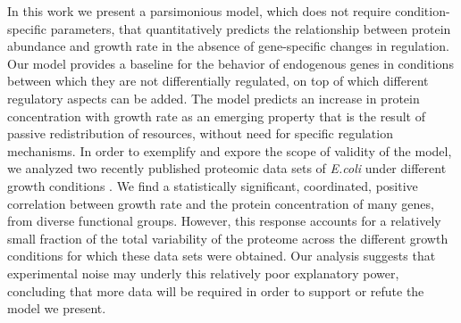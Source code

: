 In this work we present a parsimonious model, which does not require condition-specific parameters, that quantitatively predicts the relationship between protein abundance and growth rate in the absence of gene-specific changes in regulation.
Our model provides a baseline for the behavior of endogenous genes in conditions between which they are not differentially regulated, on top of which different regulatory aspects can be added.
The model predicts an increase in protein concentration with growth rate as an emerging property that is the result of passive redistribution of resources, without need for specific regulation mechanisms.
In order to exemplify and expore the scope of validity of the model, we analyzed two recently published proteomic data sets of \emph{E.coli} under different growth conditions \cite{Valgepea2013,Heinemann2015}.
We find a statistically significant, coordinated, positive correlation between growth rate and the protein concentration of many genes, from diverse functional groups.
However, this response accounts for a relatively small fraction of the total variability of the proteome across the different growth conditions for which these data sets were obtained.
Our analysis suggests that experimental noise may underly this relatively poor explanatory power, concluding that more data will be required in order to support or refute the model we present.
